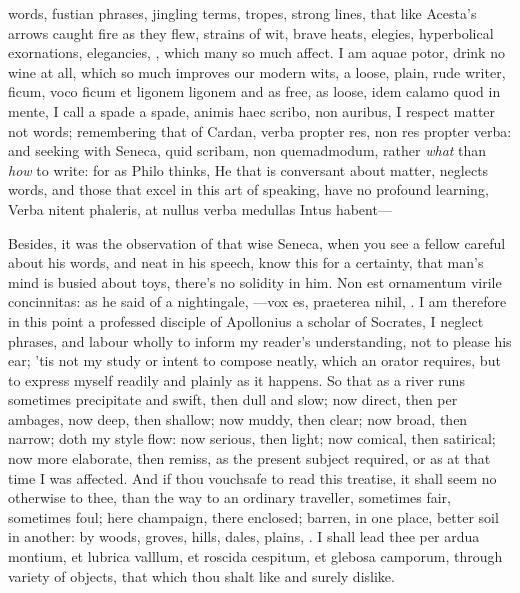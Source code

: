 {words, fustian phrases, jingling terms, tropes, strong lines, that like
Acesta's arrows caught fire as they flew, strains of wit, brave
heats, elegies, hyperbolical exornations, elegancies, \etc, which many
so much affect. I am aquae potor, drink no wine at all, which so
much improves our modern wits, a loose, plain, rude writer, ficum, voco
ficum et ligonem ligonem and as free, as loose, idem calamo quod in
mente, I call a spade a spade, animis haec scribo, non auribus, I
respect matter not words; remembering that of Cardan, verba propter
res, non res propter verba: and seeking with Seneca, quid scribam, non
quemadmodum, rather \emph{what} than \emph{how} to write: for as Philo thinks,
He that is conversant about matter, neglects words, and those that
excel in this art of speaking, have no profound learning,
Verba nitent phaleris, at nullus verba medullas
Intus habent---

Besides, it was the observation of that wise Seneca, when you see
a fellow careful about his words, and neat in his speech, know this for
a certainty, that man's mind is busied about toys, there's no solidity
in him. Non est ornamentum virile concinnitas: as he said of a
nightingale, ---vox es, praeterea nihil, \etc. I am therefore in this
point a professed disciple of Apollonius a scholar of Socrates, I
neglect phrases, and labour wholly to inform my reader's understanding,
not to please his ear; 'tis not my study or intent to compose neatly,
which an orator requires, but to express myself readily and plainly as
it happens. So that as a river runs sometimes precipitate and swift,
then dull and slow; now direct, then per ambages, now deep, then
shallow; now muddy, then clear; now broad, then narrow; doth my style
flow: now serious, then light; now comical, then satirical; now more
elaborate, then remiss, as the present subject required, or as at that
time I was affected. And if thou vouchsafe to read this treatise, it
shall seem no otherwise to thee, than the way to an ordinary traveller,
sometimes fair, sometimes foul; here champaign, there enclosed; barren,
in one place, better soil in another: by woods, groves, hills, dales,
plains, \etc. I shall lead thee per ardua montium, et lubrica valllum, et
roscida cespitum, et glebosa camporum, through variety of objects,
that which thou shalt like and surely dislike.

}

